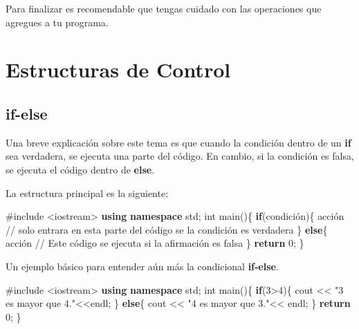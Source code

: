 \documentclass[
  11pt,
  a4paper,
  DIV=11,
  numbers=noendperiod]{scrreprt}
\newenvironment{Shaded}{\begin{snugshade}}{\end{snugshade}}
\newcommand{\CommentTok}[1]{\textcolor[rgb]{0.37,0.37,0.37}{#1}}
\newcommand{\ControlFlowTok}[1]{\textcolor[rgb]{0.00,0.23,0.31}{\textbf{#1}}}
\newcommand{\DataTypeTok}[1]{\textcolor[rgb]{0.68,0.00,0.00}{#1}}
\newcommand{\DecValTok}[1]{\textcolor[rgb]{0.68,0.00,0.00}{#1}}
\newcommand{\ImportTok}[1]{\textcolor[rgb]{0.00,0.46,0.62}{#1}}
\newcommand{\KeywordTok}[1]{\textcolor[rgb]{0.00,0.23,0.31}{\textbf{#1}}}
\newcommand{\NormalTok}[1]{\textcolor[rgb]{0.00,0.23,0.31}{#1}}
\newcommand{\OperatorTok}[1]{\textcolor[rgb]{0.37,0.37,0.37}{#1}}
\newcommand{\PreprocessorTok}[1]{\textcolor[rgb]{0.68,0.00,0.00}{#1}}
\newcommand{\StringTok}[1]{\textcolor[rgb]{0.13,0.47,0.30}{#1}}
\begin{document}
Para finalizar es recomendable que tengas cuidado con las operaciones
que agregues a tu programa.


\chapter{Estructuras de Control}\label{estructuras-de-control}

\section{if-else}\label{if-else}

Una breve explicación sobre este tema es que cuando la condición dentro
de un \textbf{if} sea verdadera, se ejecuta una parte del código. En
cambio, si la condición es falsa, se ejecuta el código dentro de
\textbf{else}.

La estructura principal es la siguiente:

\begin{Shaded}
\begin{Highlighting}[]
\PreprocessorTok{\#include }\ImportTok{\textless{}iostream\textgreater{}}
\KeywordTok{using} \KeywordTok{namespace}\NormalTok{ std}\OperatorTok{;}
\DataTypeTok{int}\NormalTok{ main}\OperatorTok{()\{}
    \ControlFlowTok{if}\OperatorTok{(}\NormalTok{condición}\OperatorTok{)\{}
\NormalTok{        acción  }\CommentTok{// solo entrara en esta parte del código se la condición es verdadera}
    \OperatorTok{\}}
    \ControlFlowTok{else}\OperatorTok{\{}
\NormalTok{        acción }\CommentTok{// Este código se ejecuta si la afirmación es falsa}
    \OperatorTok{\}}
    \ControlFlowTok{return} \DecValTok{0}\OperatorTok{;}
\OperatorTok{\}}
\end{Highlighting}
\end{Shaded}

Un ejemplo básico para entender aún más la condicional \textbf{if-else}.

\begin{Shaded}
\begin{Highlighting}[]
\PreprocessorTok{\#include }\ImportTok{\textless{}iostream\textgreater{}}
\KeywordTok{using} \KeywordTok{namespace}\NormalTok{ std}\OperatorTok{;}
\DataTypeTok{int}\NormalTok{ main}\OperatorTok{()\{}
    \ControlFlowTok{if}\OperatorTok{(}\DecValTok{3}\OperatorTok{\textgreater{}}\DecValTok{4}\OperatorTok{)\{}
\NormalTok{        cout }\OperatorTok{\textless{}\textless{}} \StringTok{"3 es mayor que 4."}\OperatorTok{\textless{}\textless{}}\NormalTok{endl}\OperatorTok{;}
    \OperatorTok{\}}
    \ControlFlowTok{else}\OperatorTok{\{}
\NormalTok{        cout }\OperatorTok{\textless{}\textless{}} \StringTok{"4 es mayor que 3."}\OperatorTok{\textless{}\textless{}}\NormalTok{ endl}\OperatorTok{;}
    \OperatorTok{\}}
    \ControlFlowTok{return} \DecValTok{0}\OperatorTok{;}
\OperatorTok{\}}
\end{Highlighting}
\end{Shaded}
\end{document}

